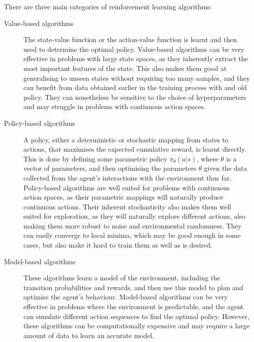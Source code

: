 There are three main categories of reinforcement learning algorithms:
\begin{description}
    \item[Value-based algorithms]
        The state-value function or the action-value function is learnt and then used  to determine the optimal policy.
        Value-based algorithms can be very effective in problems with large state spaces, as they inherently extract the most important features of the state.
        This also makes them good at generalising to unseen states without requiring too many samples, and they can benefit from data obtained earlier in the training process with and old policy.
        They can nonetheless be sensitive to the choice of hyperparameters and may struggle in problems with continuous action spaces.


    \item[Policy-based algorithms]
        A policy, either a deterministic or stochastic mapping from states to actions, that maximises the expected cumulative reward, is learnt directly.
        This is done by defining some parametric policy $\pi_\theta(a | s)$, where $\theta$ is a vector of parameters, and then optimising the parameters $\theta$ given the data collected from the agent's interactions with the environment thus far.
        Policy-based algorithms are well suited for problems with continuous action spaces, as their parametric mappings will naturally produce continuous actions.
        Their inherent stochasticity also makes them well suited for exploration, as they will naturally explore different actions, also making them more robust to noise and environmental randomness.
        They can easily converge to local minima, which may be good enough in some cases, but also make it hard to train them as well as is desired.

    \item[Model-based algorithms]
        These algorithms learn a model of the environment, including the transition probabilities and rewards, and then use this model to plan and optimise the agent's behaviour.
        Model-based algorithms can be very effective in problems where the environment is predictable, and the agent can simulate different action sequences to find the optimal policy.
        However, these algorithms can be computationally expensive and may require a large amount of data to learn an accurate model.

\end{description}

